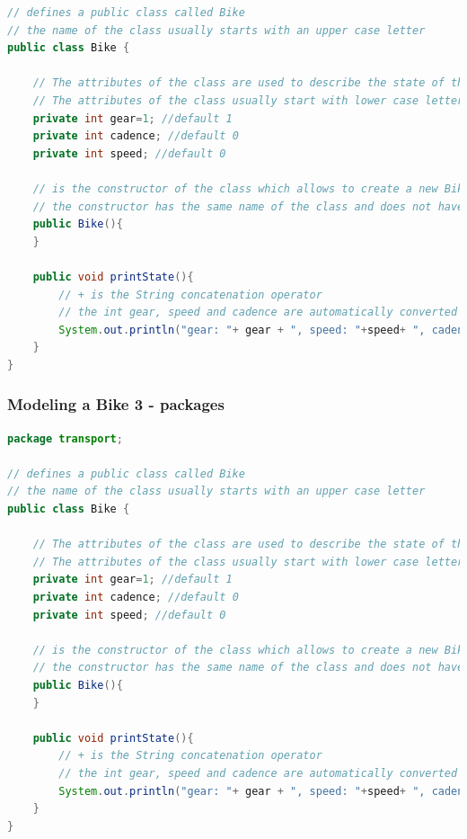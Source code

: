 \documentclass{article}
\theoremstyle{definition}
\begin{document}
\begin{lstlisting}[language=Java,escapechar=|]
// defines a public class called Bike 
// the name of the class usually starts with an upper case letter
public class Bike {
	
	// The attributes of the class are used to describe the state of the class and are usually private or protected 
	// The attributes of the class usually start with lower case letters
	private int gear=1; //default 1
	private int cadence; //default 0
	private int speed; //default 0
	
	// is the constructor of the class which allows to create a new Bike
	// the constructor has the same name of the class and does not have a return type
	public Bike(){
	}
	
	public void printState(){
	    // + is the String concatenation operator
	    // the int gear, speed and cadence are automatically converted into String
		System.out.println("gear: "+ gear + ", speed: "+speed+ ", cadence: "+cadence);
	}
}
\end{lstlisting}

\subsubsection{Modeling a Bike 3 - packages}
\begin{lstlisting}[language=Java,escapechar=|]
package transport;

// defines a public class called Bike 
// the name of the class usually starts with an upper case letter
public class Bike {
	
	// The attributes of the class are used to describe the state of the class and are usually private or protected 
	// The attributes of the class usually start with lower case letters
	private int gear=1; //default 1
	private int cadence; //default 0
	private int speed; //default 0
	
	// is the constructor of the class which allows to create a new Bike
	// the constructor has the same name of the class and does not have a return type
	public Bike(){
	}
	
	public void printState(){
	    // + is the String concatenation operator
	    // the int gear, speed and cadence are automatically converted into String
		System.out.println("gear: "+ gear + ", speed: "+speed+ ", cadence: "+cadence);
	}
}
\end{lstlisting}
\end{document}
